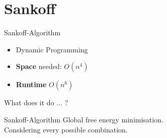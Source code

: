 \section{Sankoff}


\begin{frame}[c]{Sankoff-Algorithm}
    \Large
    \begin{itemize}[<+(1)->]
    \item Dynamic Programming
    \item {\bf Space} needed: $O(n^4)$
    \item {\bf Runtime} $O(n^6)$
    \end{itemize}
    \pause
    What does it do ... ?
\end{frame}


\begin{frame}[c]{Sankoff-Algorithm}
    \Large
    Global free energy minimisation. \\
    \pause
    Considering every possible combination.
\end{frame}

% 





